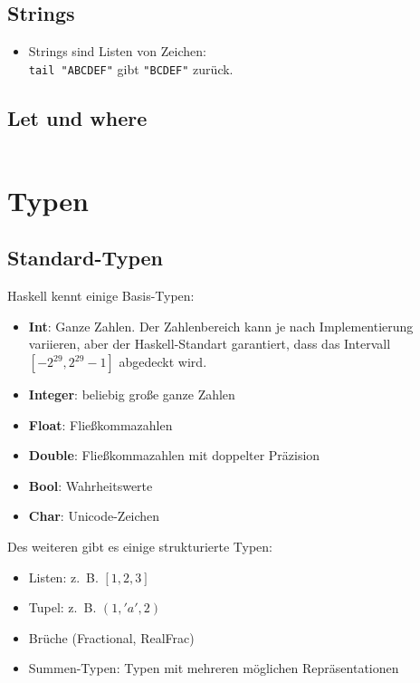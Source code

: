 \subsection{Strings}
\begin{itemize}
    \item Strings sind Listen von Zeichen:\\
          \texttt{tail "ABCDEF"} gibt \texttt{"BCDEF"} zurück.
\end{itemize}

\subsection{Let und where}%
\inputminted[numbersep=5pt, tabsize=4]{haskell}{scripts/haskell/let-where-bindung.hs}

\section{Typen}
\subsection{Standard-Typen}
Haskell kennt einige Basis-Typen:
\begin{itemize}
  \item \textbf{Int}: Ganze Zahlen. Der Zahlenbereich kann je nach Implementierung variieren,
  aber der Haskell-Standart garantiert, dass das Intervall 
  $[-2^{29}, 2^{29}-1]$ abgedeckt wird.
  \item \textbf{Integer}: beliebig große ganze Zahlen
  \item \textbf{Float}: Fließkommazahlen
  \item \textbf{Double}: Fließkommazahlen mit doppelter Präzision
  \item \textbf{Bool}: Wahrheitswerte
  \item \textbf{Char}: Unicode-Zeichen
\end{itemize}

Des weiteren gibt es einige strukturierte Typen:
\begin{itemize}
  \item Listen: z.~B. $[1,2,3]$
  \item Tupel: z.~B. $(1,'a',2)$
  \item Brüche (Fractional, RealFrac)
  \item Summen-Typen: Typen mit mehreren möglichen Repräsentationen
\end{itemize}

